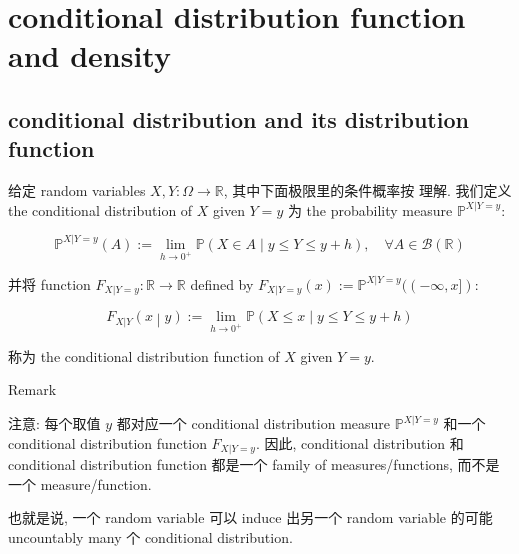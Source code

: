 \section{conditional distribution function and density}\label{conditional-distribution-function-and-density}

\subsection{conditional distribution and its distribution function}\label{conditional-distribution-and-its-distribution-function}

\begin{definition}{}

给定 random variables \(\mathit{X},\mathit{Y}:\Omega\rightarrow\mathbb{R}\), 其中下面极限里的条件概率按  理解. 我们定义 the conditional distribution of \(\mathit{X}\) given \(\mathit{Y} = \mathit{y}\) 为 the probability measure \(\mathbb{P}^{\mathit{X}|\mathit{Y} = \mathit{y}}\):

\[\mathbb{P}^{\mathit{X}|\mathit{Y} = \mathit{y}}(\mathit{A}) := \lim\limits_{h\rightarrow 0^{+}}\mathbb{P}(\mathit{X} \in \mathit{A} \mid \mathit{y} \leq \mathit{Y} \leq \mathit{y} + h),\quad\forall\mathit{A} \in \mathcal{B}(\mathbb{R})\]

并将 function \(\mathit{F}_{\mathit{X}|\mathit{Y} = \mathit{y}}:\mathbb{R}\rightarrow\mathbb{R}\) defined by \(\mathit{F}_{\mathit{X}|\mathit{Y} = \mathit{y}}(\mathit{x}) := \mathbb{P}^{\mathit{X}|\mathit{Y} = \mathit{y}}(( - \infty,\mathit{x}\rbrack)\):

\[\left. \mathit{F}_{\mathit{X}|\mathit{Y}}(\mathit{x} \middle| \mathit{y}) := \lim\limits_{h\rightarrow 0^{+}}\mathbb{P}(\mathit{X} \leq \mathit{x} \mid \mathit{y} \leq \mathit{Y} \leq \mathit{y} + h) \right.\]

称为 the conditional distribution function of \(\mathit{X}\) given \(\mathit{Y} = \mathit{y}\).

\end{definition}

\begin{qlremark}{Remark}

注意: 每个取值 \(\mathit{y}\) 都对应一个 conditional distribution measure \(\mathbb{P}^{\mathit{X}|\mathit{Y} = \mathit{y}}\) 和一个 conditional distribution function \(\mathit{F}_{\mathit{X}|\mathit{Y} = \mathit{y}}\). 因此, conditional distribution 和 conditional distribution function 都是一个 family of measures/functions, 而不是一个 measure/function.

也就是说, 一个 random variable 可以 induce 出另一个 random variable 的可能 uncountably many 个 conditional distribution.

\end{qlremark}

